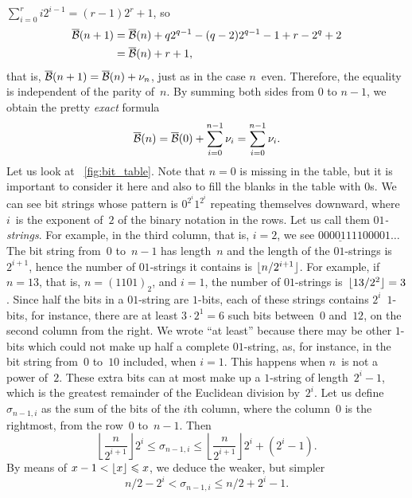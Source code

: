 \(\sum_{i=0}^{r}{i2^{i-1}} = (r-1)2^{r} + 1\), so
\begin{align*}
\overline{\mathcal{B}}(n+1) &= \overline{\mathcal{B}}(n) + q2^{q-1} - (q-2)2^{q-1} - 1 + r - 2^q + 2\\
            &= \overline{\mathcal{B}}(n) + r + 1,
\end{align*}
that is, \(\overline{\mathcal{B}}(n+1) = \overline{\mathcal{B}}(n) + \nu_n\), just as in the case
\(n\)~even. Therefore, the equality is independent of the parity
of~\(n\). By summing both sides from \(0\) to \(n-1\), we obtain the
pretty \emph{exact} formula
\[
\overline{\mathcal{B}}(n) = \overline{\mathcal{B}}(0) + \sum_{i=0}^{n-1}{\nu_i} = \sum_{i=0}^{n-1}{\nu_i}.
\]
Let us look at \fig~\vref{fig:bit_table}. Note that \(n=0\) is missing
in the table, but it is important to consider it here and also to fill
the blanks in the table with \(0\)s. We can see bit strings whose
pattern is \(0^{2^{i}}1^{2^{i}}\) repeating themselves downward, where
\(i\)~is the exponent of~\(2\) of the binary notation in the rows. Let
us call them \emph{\(01\)\hyp{}strings}. For example, in the third
column, that is, \({i=2}\), we see \(\underline{00001111}00001\dots\)
The bit string from~\(0\) to~\(n-1\) has length~\(n\) and the length
of the \(01\)\hyp{}strings is \(2^{i+1}\), hence the number of
\(01\)\hyp{}strings it contains is \(\lfloor{n/2^{i+1}}\rfloor\). For example,
if~\(n=13\), that is, \(n=(1101)_2\), and \({i=1}\), the number of
\(01\)\hyp{}strings is~\(\lfloor{13/2^2}\rfloor = 3\). Since half the bits in
a \(01\)\hyp{}string are \(1\)\hyp{}bits, each of these strings
contains \(2^i\)~\(1\)\hyp{}bits, for instance, there are at least \(3
\cdot 2^1 = 6\) such bits between~\(0\) and~\(12\), on the second
column from the right. We wrote ``at least'' because there may be
other \(1\)\hyp{}bits which could not make up half a complete
\(01\)\hyp{}string, as, for instance, in the bit string from~\(0\)
to~\(10\) included, when \(i=1\). This happens when \(n\)~is not a
power of~\(2\). These extra bits can at most make up a
\(1\)\hyp{}string of length~\(2^{i}-1\), which is the greatest
remainder of the Euclidean division by~\(2^{i}\). Let us
define~\(\sigma_{n-1,i}\) as the sum of the bits of the \(i\)th
column, where the column~\(0\) is the rightmost, from the row~\(0\)
to~\(n-1\). Then
\begin{equation*}
\left\lfloor\frac{n}{2^{i+1}}\right\rfloor 2^i 
\leqslant \sigma_{n-1,i} \leqslant
\left\lfloor\frac{n}{2^{i+1}}\right\rfloor 2^i + (2^i - 1).
\end{equation*}
By means of \(x - 1 < \lfloor{x}\rfloor \leqslant x\), we deduce the weaker,
but simpler
\begin{equation}
n/2 - 2^{i} < \sigma_{n-1,i} \leqslant n/2 + 2^{i} - 1.
\label{ineq:sigma}
\end{equation}
